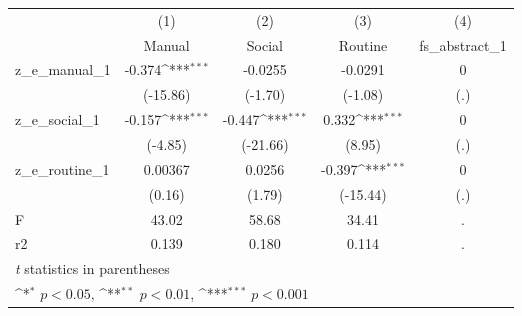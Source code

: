 {
\def\sym#1{\ifmmode^{#1}\else\(^{#1}\)\fi}
\begin{tabular}{l*{4}{c}}
\toprule
            &\multicolumn{1}{c}{(1)}&\multicolumn{1}{c}{(2)}&\multicolumn{1}{c}{(3)}&\multicolumn{1}{c}{(4)}\\
            &\multicolumn{1}{c}{Manual}&\multicolumn{1}{c}{Social}&\multicolumn{1}{c}{Routine}&\multicolumn{1}{c}{fs\_abstract\_1}\\
\midrule
z\_e\_manual\_1&      -0.374\sym{***}&     -0.0255         &     -0.0291         &           0         \\
            &    (-15.86)         &     (-1.70)         &     (-1.08)         &         (.)         \\
\addlinespace
z\_e\_social\_1&      -0.157\sym{***}&      -0.447\sym{***}&       0.332\sym{***}&           0         \\
            &     (-4.85)         &    (-21.66)         &      (8.95)         &         (.)         \\
\addlinespace
z\_e\_routine\_1&     0.00367         &      0.0256         &      -0.397\sym{***}&           0         \\
            &      (0.16)         &      (1.79)         &    (-15.44)         &         (.)         \\
\midrule
F           &       43.02         &       58.68         &       34.41         &           .         \\
r2          &       0.139         &       0.180         &       0.114         &           .         \\
\bottomrule
\multicolumn{5}{l}{\footnotesize \textit{t} statistics in parentheses}\\
\multicolumn{5}{l}{\footnotesize \sym{*} \(p<0.05\), \sym{**} \(p<0.01\), \sym{***} \(p<0.001\)}\\
\end{tabular}
}

